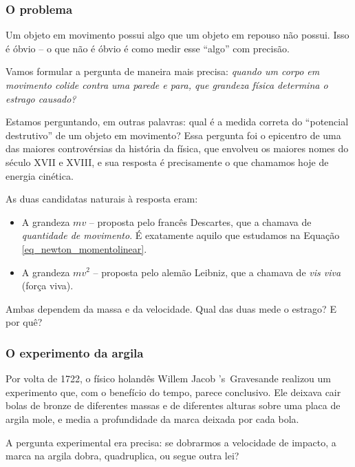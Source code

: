 \subsubsection*{O problema}

Um objeto em movimento possui algo que um objeto em repouso não possui. Isso é óbvio -- o que não é óbvio é como medir esse ``algo'' com precisão.
 
Vamos formular a pergunta de maneira mais precisa: \emph{quando um corpo em movimento
colide contra uma parede e para, que grandeza física determina o estrago causado?}
 
Estamos perguntando, em outras palavras: qual é a medida correta do ``potencial
destrutivo'' de um objeto em movimento? Essa pergunta foi o
epicentro de uma das maiores controvérsias da história da física, que envolveu os maiores
nomes do século XVII e XVIII, e sua resposta é precisamente o que chamamos hoje de
energia cinética.
 
As duas candidatas naturais à resposta eram:
 
\begin{itemize}
    \item [(i)] A grandeza $mv$ -- proposta pelo francês Descartes, que a chamava de
          \textit{quantidade de movimento}. É exatamente aquilo que estudamos na Equação \eqref{eq_newton_momentolinear}.
    \item [(ii)] A grandeza $mv^2$ -- proposta pelo alemão Leibniz, que a chamava de
          \textit{vis viva} (força viva).
\end{itemize}
 
\noindent Ambas dependem da massa e da velocidade. Qual das duas mede o estrago?
E por quê?
 
\subsubsection*{O experimento da argila}
 
Por volta de 1722, o físico holandês Willem Jacob \mbox{'s~Gravesande} realizou um
experimento que, com o benefício do tempo, parece conclusivo. Ele deixava cair bolas de
bronze de diferentes massas e de diferentes alturas sobre uma placa de argila mole,
e media a profundidade da marca deixada por cada bola.
 
A pergunta experimental era precisa: se dobrarmos a velocidade de impacto, a marca
na argila dobra, quadruplica, ou segue outra lei?
 
